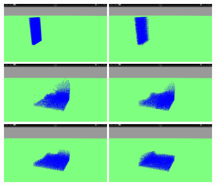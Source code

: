 \documentclass[polish, 12pt]{aghthesis}
\begin{document}
	\begin{figure}[h!]
	\centering
		\includegraphics[width=0.49\textwidth]{1.png}
		\includegraphics[width=0.49\textwidth]{2.png}
		\includegraphics[width=0.49\textwidth]{3.png}
		\includegraphics[width=0.49\textwidth]{4.png}
		\includegraphics[width=0.49\textwidth]{5.png}
		\includegraphics[width=0.49\textwidth]{6.png}

\end{figure}
\end{document}
